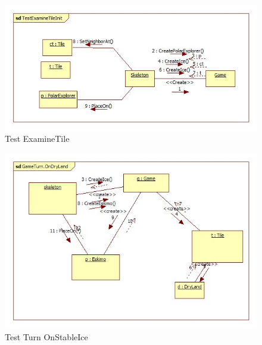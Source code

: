 \begin{figure}[H]
	\begin{center}
		\includegraphics[width=17cm]{chapters/chapter05/diagrams/Test_ExamineTile_init.jpg}
		\caption{Test ExamineTile}
		\label{fig:Test ExamineTile}
	\end{center}
\end{figure}

\begin{figure}[H]
	\begin{center}
		\includegraphics[width=17cm]{chapters/chapter05/diagrams/Test_Turn_OnStableIce_init.jpg}
		\caption{Test Turn OnStableIce}
		\label{fig:Test Turn OnStableIce}
	\end{center}
\end{figure}

